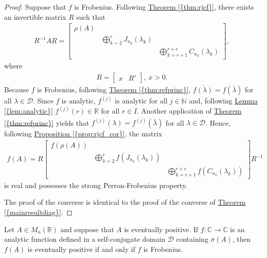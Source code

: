 \documentclass[10pt,twoside,leqno]{siamltex}
\begin{document}
\begin{proof}
Suppose that $f$ is Frobenius. Following {\hyperref[{thm:rjcf}]{{\rm {Theorem} \ref*{{thm:rjcf}}}}}, there exists an invertible matrix $R$ such that 
\begin{align*}
{{R}^{-1}} A R =
\begin{bmatrix}
{\rho\left({A}\right)} & 															\\ 
	& \bigoplus_{k=2}^{r} J_{n_k} (\lambda_k) 	& 								\\ 
	&							& \bigoplus_{k = r + 1}^{r + c} C_{n_k} (\lambda_k)  
\end{bmatrix},															
\end{align*}
where 
\begin{align*}
R= 
\begin{bmatrix}
x & R'
\end{bmatrix},~x>0.
\end{align*}
Because $f$ is Frobenius, following {\hyperref[{thm:refprinc}]{{\rm {Theorem} \ref*{{thm:refprinc}}}}}, $\overline{f(\lambda)} = f(\bar{\lambda})$ for all $\lambda \in \mathcal{D}$. Since $f$ is analytic, $f^{(j)}$ is analytic for all $j \in {\mathbb{{N}}}$ and, following {\hyperref[{lem:analytic}]{{\rm {Lemma} \ref*{{lem:analytic}}}}} $f^{(j)}(r) \in {\mathbb{{R}}}$ for all $r \in I$. Another application of {\hyperref[{thm:refprinc}]{{\rm {Theorem} \ref*{{thm:refprinc}}}}} yields that $\overline{f^{(j)}(\lambda)} = f^{(j)}(\bar{\lambda})$ for all $\lambda \in \mathcal{D}$. Hence, following {\hyperref[{prop:rjcf_cor}]{{\rm {Proposition} \ref*{{prop:rjcf_cor}}}}}, the matrix 
\begin{align*}
f(A) =
R
\begin{bmatrix}
f({\rho\left({A}\right)}) 	& 																	\\ 
		& \bigoplus_{k=2}^{r} f(J_{n_k} (\lambda_k)) 	& 									\\ 
		&								& \bigoplus_{k = r + 1}^{r + c} f(C_{n_k}(\lambda_k))  
\end{bmatrix} {{R}^{-1}}															
\end{align*}
is real and possesses the strong Perron-Frobenius property.

The proof of the converse is identical to the proof of the converse of {\hyperref[{mainresultdiag}]{{\rm {Theorem} \ref*{{mainresultdiag}}}}}. 
\end{proof}

\begin{corollary}
Let $A \in {M_{{n}}({{\mathbb{{R}}}})}$ and suppose that $A$ is eventually positive. If $f: {\mathbb{{C}}} \longrightarrow {\mathbb{{C}}}$ is an analytic function defined in a self-conjugate domain $\mathcal{D}$ containing ${\sigma \left( {A} \right)}$, then $f(A)$ is eventually positive if and only if $f$ is Frobenius.
\end{corollary}
\end{document}
